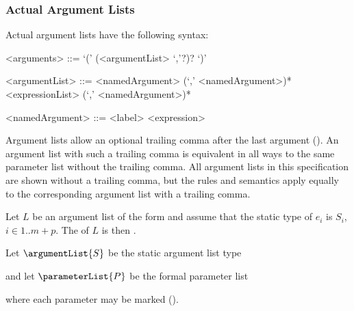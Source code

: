 \documentclass[makeidx]{article}
\begin{document}
{



\subsubsection{Actual Argument Lists}

\LMHash{}%
Actual argument lists have the following syntax:

\begin{grammar}
<arguments> ::= `(' (<argumentList> `,'?)? `)'

<argumentList> ::= <namedArgument> (`,' <namedArgument>)*
  \alt <expressionList> (`,' <namedArgument>)*

<namedArgument> ::= <label> <expression>
\end{grammar}

\LMHash{}%
Argument lists allow an optional trailing comma after the last argument
().
An argument list with such a trailing comma is equivalent in all ways to
the same parameter list without the trailing comma.
All argument lists in this specification are shown without a trailing comma,
but the rules and semantics apply equally to
the corresponding argument list with a trailing comma.

\LMHash{}%
Let $L$ be an argument list of the form
and assume that the static type of $e_i$ is $S_i$, $i \in 1 .. m+p$.
The  of $L$ is then
.

\LMHash{}%
Let $\argumentList{S}$ be the static argument list type


\noindent
and let $\parameterList{P}$ be the formal parameter list


\noindent
where each parameter may be marked \COVARIANT{}
().

}
\end{document}
